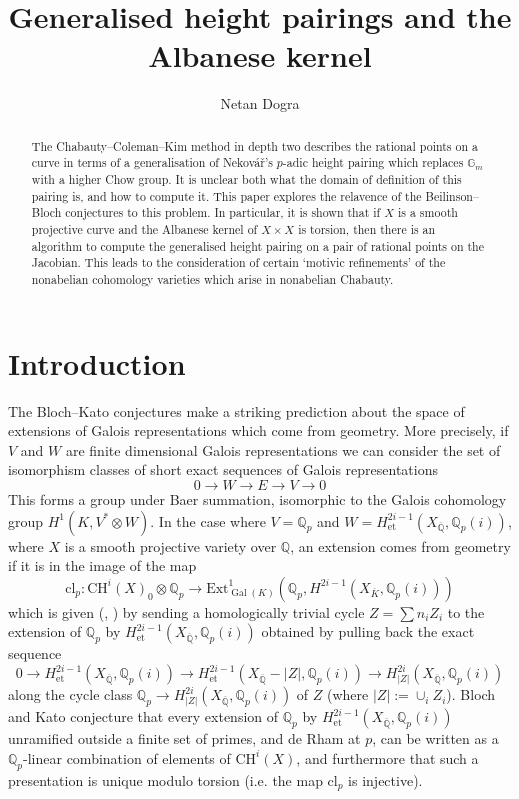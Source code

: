 \documentclass[11pt]{amsart}
\def\Q{\mathbb Q}
\newcommand{\Ext}{\mathrm{Ext}}
\def\cl{\mathrm{cl}}
\theoremstyle{plain}
\theoremstyle{definition}
\DeclareMathOperator{\Gal}{Gal}
\newcommand{\CH}{\mathrm{CH}}
\newcommand{\et}{\mathrm{et}}
\begin{document}
\title{Generalised height pairings and the Albanese kernel}
\author{Netan Dogra}
\maketitle

\begin{abstract}
The Chabauty--Coleman--Kim method in depth two describes the rational points on a curve in terms of a generalisation of Nekov\'a\v r's $p$-adic height pairing which replaces $\mathbb{G}_m$ with a higher Chow group. It is unclear both what the domain of definition of this pairing is, and how to compute it. This paper explores the relavence of the Beilinson--Bloch conjectures to this problem. In particular, it is shown that if $X$ is a smooth projective curve and the Albanese kernel of $X\times X$ is torsion, then there is an algorithm to compute the generalised height pairing on a pair of rational points on the Jacobian. This leads to the consideration of certain `motivic refinements' of the nonabelian cohomology varieties which arise in nonabelian Chabauty.
\end{abstract}

\tableofcontents
\section{Introduction}
The Bloch--Kato conjectures \cite{BK} make a striking prediction about the space of extensions of Galois representations which come from geometry. More precisely, if $V$ and $W$ are finite dimensional Galois representations we can consider the set of isomorphism classes of short exact sequences of Galois representations
\[
0\to W\to E\to V\to 0
\]
This forms a group under Baer summation, isomorphic to the Galois cohomology group $H^1 (K,V^* \otimes W)$. In the case where $V=\Q _p $ and $W=H^{2i-1}_{\et }(X_{\overline{\Q }},\Q _p (i))$, where $X$ is a smooth projective variety over $\Q $, an extension comes from geometry if it is in the image of the map
\[
\cl _p :\CH ^i (X)_0 \otimes \Q _p \to \Ext ^1 _{\Gal (K)}(\Q _p ,H^{2i-1}(X_{\overline{K}},\Q _p (i)))
\]
which is given (\cite{deligne:valeurs}, \cite[II.9]{jannsen1990}) by sending a homologically trivial cycle $Z=\sum n_i Z_i $ to the extension of $\Q _p $ by $H^{2i-1}_{\et }(X_{\overline{\Q }},\Q _p (i))$ obtained by pulling back the exact sequence
\[
0\to H^{2i-1}_{\et }(X_{\overline{\Q }},\Q _p (i))\to H^{2i-1}_{\et }(X_{\overline{\Q }}-|Z| ,\Q _p (i))\to H^{2i} _{| Z| }(X_{\overline{\Q }},\Q _p (i))
\]
along the cycle class $\Q _p \to H^{2i}_{|Z|}(X_{\overline{\Q }},\Q _p (i))$ of $Z$ (where $|Z|:=\cup _i Z_i $). Bloch and Kato conjecture that every extension of $\Q _p $ by $H^{2i-1}_{\et }(X_{\overline{\Q }},\Q _p (i))$ unramified outside a finite set of primes, and de Rham at $p$, can be written as a $\Q _p$-linear combination of elements of $\CH ^i (X)$, and furthermore that such a presentation is unique modulo torsion (i.e. the map $\cl _p $ is injective).
\end{document}
